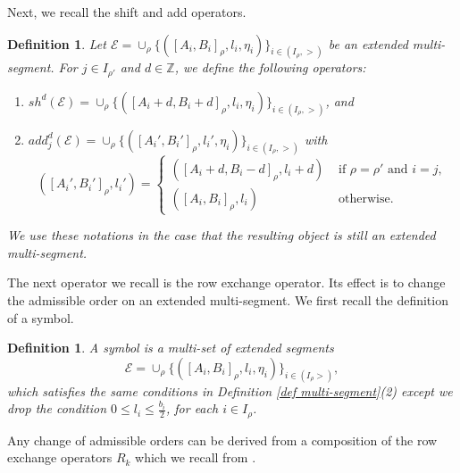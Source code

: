 \documentclass[11pt,letterpaper]{amsart}
\newcommand{\Z}{\mathbb{Z}}
\newcommand{\EE}{\mathcal{E}}
\newtheorem{defn}[thm]{Definition}
\numberwithin{equation}{section}
\begin{document}
Next, we recall the shift and add operators. 

\begin{defn}\label{defn shift and add}
Let $\EE = \cup_{\rho}\{ ([A_i,B_i]_{\rho}, l_i, \eta_i) \}_{i \in (I_\rho,>)}$ be an extended multi-segment. For $j \in I_{\rho'}$ and $d \in \Z$, we define the following operators: 

\begin{enumerate}
    \item [1.] $sh^{d}(\EE)= \cup_{\rho}\{ ([A_i+d,B_i+d]_{\rho}, l_i, \eta_i) \}_{i \in (I_\rho,>)}$, and
     \item [2.] $add_j^{d}(\EE)= \cup_{\rho}\{ ([A_i',B_i']_{\rho}, l_i', \eta_i) \}_{i \in (I_\rho,>)}$ with 
    \[ ([A_i',B_i']_{\rho},l_i')= \begin{cases}
    ([A_i+d,B_i-d]_{\rho},l_i+d) & \text{ if }\rho=\rho' \text{ and } i = j,\\
     ([A_i,B_i]_{\rho},l_i) & \text{ otherwise. }\end{cases} 
    \]
\end{enumerate}
We use these notations in the case that the resulting object is still an extended multi-segment.
\end{defn}


The next operator we recall is the row exchange operator. Its effect is to change the admissible order on an extended multi-segment. We first recall the definition of a symbol.
\begin{defn}\label{def symbol}
  A \emph{symbol} is a multi-set of extended segments 
\[
\EE = \cup_{\rho}\{ ([A_i,B_i]_{\rho}, l_i, \eta_i) \}_{i \in (I_\rho>)},
\] which satisfies the same conditions in Definition \ref{def multi-segment}(2) except we drop the condition $0 \leq l_i \leq \frac{b_i}{2}$, for each $i \in I_{\rho}$.
\end{defn}

Any change of admissible orders can be derived from a composition of the row exchange operators $R_k$ which we recall from \cite[Definition 3.15]{HLL22}.
\end{document}
